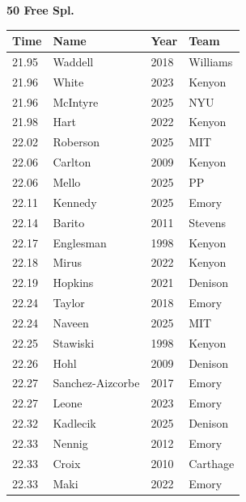 \noindent\begin{minipage}[t]{0.98\textwidth}
\centering
\textbf{\textcolor{teamprimary}{50 Free Spl.}}\par
\vspace{0.5em}
\centering
\small
\renewcommand{\arraystretch}{1.0}
\setlength{\tabcolsep}{4pt}
\begin{tabular}{@{}p{2.5cm}p{4.5cm}p{1.5cm}p{2.5cm}@{}}
\toprule
\textbf{Time} & \textbf{Name} & \textbf{Year} & \textbf{Team} \\
\midrule
21.95 & Waddell & 2018 & Williams \\
21.96 & White & 2023 & Kenyon \\
21.96 & McIntyre & 2025 & NYU \\
21.98 & Hart & 2022 & Kenyon \\
22.02 & Roberson & 2025 & MIT \\
22.06 & Carlton & 2009 & Kenyon \\
22.06 & Mello & 2025 & PP \\
22.11 & Kennedy & 2025 & Emory \\
22.14 & Barito & 2011 & Stevens \\
22.17 & Englesman & 1998 & Kenyon \\
22.18 & Mirus & 2022 & Kenyon \\
22.19 & Hopkins & 2021 & Denison \\
22.24 & Taylor & 2018 & Emory \\
22.24 & Naveen & 2025 & MIT \\
22.25 & Stawiski & 1998 & Kenyon \\
22.26 & Hohl & 2009 & Denison \\
22.27 & Sanchez-Aizcorbe & 2017 & Emory \\
22.27 & Leone & 2023 & Emory \\
22.32 & Kadlecik & 2025 & Denison \\
22.33 & Nennig & 2012 & Emory \\
22.33 & Croix & 2010 & Carthage \\
22.33 & Maki & 2022 & Emory \\
\bottomrule
\end{tabular}
\end{minipage}
\vspace{1.2em}
